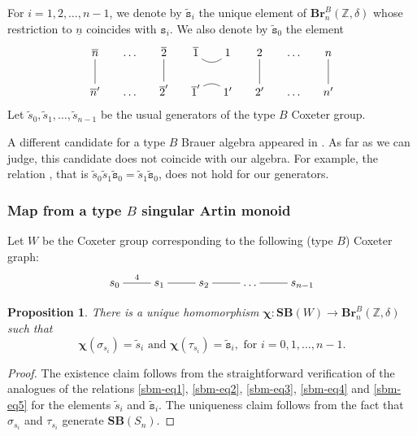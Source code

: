 \documentclass[a4paper]{amsart}
\newtheorem{proposition}[theorem]{Proposition}
\begin{document}
For $i=1,2,\dots,n-1$, we denote by $\tilde{\mathtt{s}}_i$ the unique element of
$\mathbf{Br}_n^B(\mathbb{Z},\delta)$ whose restriction to $\underline{n}$
coincides with $\mathtt{s}_i$. We also denote by $\tilde{\mathtt{s}}_0$
the element
\begin{displaymath}
\xymatrix@R=7mm@C=5mm{
\overline{n}\ar@{-}[d]&\dots&\overline{2}\ar@{-}[d]
&\overline{1}\ar@/_8pt/@{-}[r]&1&2\ar@{-}[d]&\dots&n\ar@{-}[d]\\
\overline{n}'&\dots&\overline{2}'&\overline{1}'\ar@/^8pt/@{-}[r]
&1'&2'&\dots&n'
}
\end{displaymath}
Let $\tilde{s}_0,\tilde{s}_1,\dots,\tilde{s}_{n-1}$ be the usual generators of the type $B$
Coxeter group.

A different candidate for a type $B$ Brauer algebra appeared in \cite{CL}.
As far as we can judge, this candidate does not coincide with  
our algebra. For example,  the relation \cite[2.12]{CL}, that is 
$\tilde{s}_0\tilde{s}_1\tilde{\mathtt{s}}_0=\tilde{s}_1\tilde{\mathtt{s}}_0$, does not 
hold for our generators.

\subsubsection{Map from a type $B$ singular Artin monoid}\label{s4.4.5}

Let $W$ be the Coxeter group corresponding to the following (type $B$) Coxeter graph:
\begin{displaymath}
\xymatrix{s_0\ar@{-}[r]^4&s_1\ar@{-}[r]&s_2\ar@{-}[r]&\dots\ar@{-}[r]&s_{n-1}} 
\end{displaymath}

\begin{proposition}\label{prop-4.4.5-1}
There is a unique homomorphism $\boldsymbol{\chi}:\mathbf{SB}(W)\to
\mathbf{Br}_n^B(\mathbb{Z},\delta)$ such that
\begin{displaymath}
\boldsymbol{\chi}(\sigma_{s_i})=\tilde{s}_i\text{ and }
\boldsymbol{\chi}(\tau_{s_i})=\tilde{\mathtt{s}}_i,\text{ for }i=0,1,\dots,n-1.
\end{displaymath}
\end{proposition}

\begin{proof}
The existence claim follows from the straightforward verification of the 
analogues  of the relations \eqref{sbm-eq1}, \eqref{sbm-eq2}, \eqref{sbm-eq3}, 
\eqref{sbm-eq4} and \eqref{sbm-eq5} for the elements $\tilde{s}_i$ and $\tilde{\mathtt{s}}_i$.
The uniqueness claim follows from the fact that $\sigma_{s_i}$ and $\tau_{s_i}$
generate $\mathbf{SB}(S_n)$. 
\end{proof}
\end{document}
